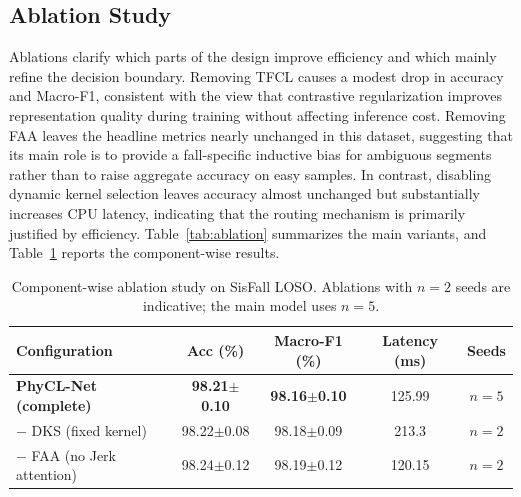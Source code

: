 \documentclass[jec]{acnsart}
\begin{document}
\subsection{Ablation Study}

Ablations clarify which parts of the design improve efficiency and which mainly refine the decision boundary. Removing TFCL causes a modest drop in accuracy and Macro-F1, consistent with the view that contrastive regularization improves representation quality during training without affecting inference cost. Removing FAA leaves the headline metrics nearly unchanged in this dataset, suggesting that its main role is to provide a fall-specific inductive bias for ambiguous segments rather than to raise aggregate accuracy on easy samples. In contrast, disabling dynamic kernel selection leaves accuracy almost unchanged but substantially increases CPU latency, indicating that the routing mechanism is primarily justified by efficiency. Table~\ref{tab:ablation} summarizes the main variants, and Table~\ref{tab:detailed_ablation} reports the component-wise results.

\begin{table}[htbp]
\caption{Ablation summary under SisFall LOSO.}
\label{tab:ablation}
\centering
\small
\setlength{\tabcolsep}{3pt}
\end{table}

\begin{table}[htbp]
\caption{Component-wise ablation study on SisFall LOSO. Ablations with $n{=}2$ seeds are indicative; the main model uses $n{=}5$.}
\label{tab:detailed_ablation}
\centering
\small
\begin{tabular}{lcccc}
\toprule
Configuration & Acc (\%) & Macro-F1 (\%) & Latency (ms) & Seeds \\
\midrule
\textbf{PhyCL-Net (complete)} & \textbf{98.21$\pm$0.10} & \textbf{98.16$\pm$0.10} & 125.99 & $n{=}5$ \\
\midrule
$-$ DKS (fixed kernel) & 98.22$\pm$0.08 & 98.18$\pm$0.09 & 213.3 & $n{=}2$ \\
$-$ FAA (no Jerk attention) & 98.24$\pm$0.12 & 98.19$\pm$0.12 & 120.15 & $n{=}2$ \\
\bottomrule
\end{tabular}
\end{table}
\end{document}
